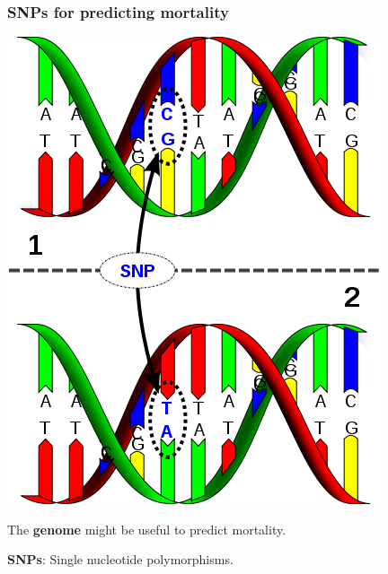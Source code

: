 \documentclass[aspectratio=169]{beamer}
\begin{document}
\begin{frame}
\frametitle{SNPs for predicting mortality}  

\begin{minipage}[c]{0.45\textwidth}
  \includegraphics[width=0.8\linewidth]{figures/SNP.png}
\end{minipage}
\begin{minipage}[c]{0.5\textwidth}

  The \textbf{genome} might be useful to predict mortality.

  \vspace{1cm}

  \textbf{SNPs}: Single nucleotide polymorphisms.

\end{minipage}
\end{frame}
\end{document}
